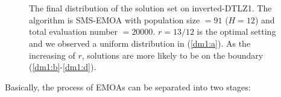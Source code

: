 \documentclass[conference]{IEEEtran}
\begin{document}
\begin{figure}[!t]
  \centering
  \quad
  \\
  \quad
  \\
  \caption{The final distribution of the solution set on inverted-DTLZ1.
  The algorithm is SMS-EMOA with population size $=91$ ($H=12$) and total evaluation number $=20000$.
  $r=13/12$ is the optimal setting and we observed a uniform distribution in (\ref{dm1:a}).
  As the increasing of $r$, solutions are more likely to be on the boundary
  (\ref{dm1:b}-\ref{dm1:d}). 
  }
  \label{dm1}
\end{figure}

%
% 
Basically, the process of EMOAs can be separated into
two stages:
\end{document}
